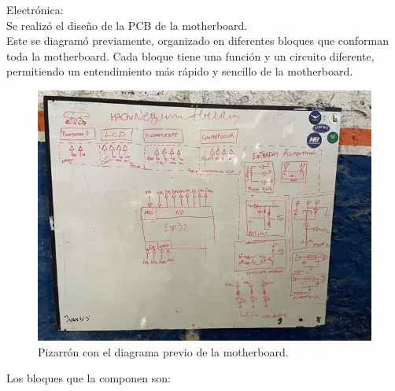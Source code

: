Electrónica:\\

Se realizó el diseño de la PCB de la motherboard. \\

Este se diagramó previamente, organizado en diferentes bloques que conforman toda la motherboard. Cada bloque tiene una función y un circuito diferente, permitiendo un entendimiento más rápido y sencillo de la motherboard.\\

\begin{figure}[H]
    \centering
    \includegraphics[width=0.75\linewidth]{informes/IMG_8309.jpg}
    \caption{Pizarrón con el diagrama previo de la motherboard.}
    
\end{figure}

Los bloques que la componen son:

